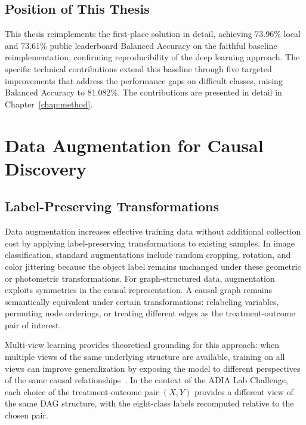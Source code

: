 \subsection{Position of This Thesis}
\label{sec:thesis_position}

This thesis reimplements the first-place solution in detail, achieving 73.96\% local and 73.61\% public leaderboard Balanced Accuracy on the faithful baseline reimplementation, confirming reproducibility of the deep learning approach. The specific technical contributions extend this baseline through five targeted improvements that address the performance gaps on difficult classes, raising Balanced Accuracy to 81.082\%. The contributions are presented in detail in Chapter~\ref{chap:method}.

\section{Data Augmentation for Causal Discovery}
\label{sec:data_augmentation}

\subsection{Label-Preserving Transformations}
\label{sec:label_preserving}

Data augmentation increases effective training data without additional collection cost by applying label-preserving transformations to existing samples. In image classification, standard augmentations include random cropping, rotation, and color jittering because the object label remains unchanged under these geometric or photometric transformations. For graph-structured data, augmentation exploits symmetries in the causal representation. A causal graph remains semantically equivalent under certain transformations: relabeling variables, permuting node orderings, or treating different edges as the treatment-outcome pair of interest.

Multi-view learning provides theoretical grounding for this approach: when multiple views of the same underlying structure are available, training on all views can improve generalization by exposing the model to different perspectives of the same causal relationships~\cite{sun2019multiview}. In the context of the ADIA Lab Challenge, each choice of the treatment-outcome pair $(X,Y)$ provides a different view of the same DAG structure, with the eight-class labels recomputed relative to the chosen pair.

